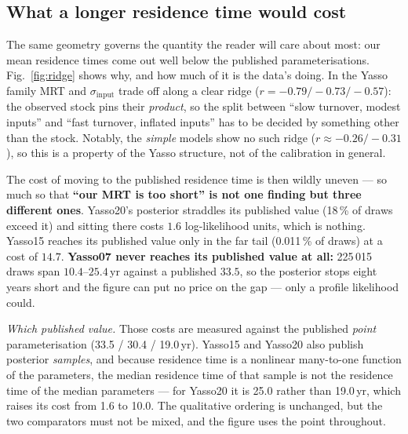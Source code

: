 \documentclass[11pt]{article}
\newcommand{\sinput}{\sigma_{\mathrm{input}}}
\newcommand{\fig}{figures}
\begin{document}
\begin{table}[htbp]\centering
\caption{\textbf{The strongest same-pool anti-correlations} (Yasso20): each is a net-flux trade-off along which the
posterior is unconstrained.}\label{tab:ridges}

\end{table}

\subsection{What a longer residence time would cost}
The same geometry governs the quantity the reader will care about most: our mean residence times come
out well below the published parameterisations. Fig.~\ref{fig:ridge} shows why, and how much of it is
the data's doing. In the Yasso family MRT and $\sinput$ trade off along a clear ridge
($r=-0.79/-0.73/-0.57$): the observed stock pins their \emph{product}, so the split between ``slow
turnover, modest inputs'' and ``fast turnover, inflated inputs'' has to be decided by something other
than the stock. Notably, the \emph{simple} models show no such ridge ($r\approx-0.26/-0.31$), so this
is a property of the Yasso structure, not of the calibration in general.

The cost of moving to the published residence time is then wildly uneven --- so much so that
\textbf{``our MRT is too short'' is not one finding but three different ones}. Yasso20's posterior
straddles its published value (18\,\% of draws exceed it) and sitting there costs $1.6$
log-likelihood units, which is nothing. Yasso15 reaches its published value only in the far tail
(0.011\,\% of draws) at a cost of $14.7$. \textbf{Yasso07 never reaches its published value at all:}
225\,015 draws span $10.4$--$25.4$\,yr against a published $33.5$, so the posterior stops eight years
short and the figure can put no price on the gap --- only a profile likelihood could.

\emph{Which published value.} Those costs are measured against the published \emph{point}
parameterisation (33.5 / 30.4 / 19.0\,yr). Yasso15 and Yasso20 also publish posterior \emph{samples},
and because residence time is a nonlinear many-to-one function of the parameters, the median residence
time of that sample is not the residence time of the median parameters --- for Yasso20 it is 25.0
rather than 19.0\,yr, which raises its cost from 1.6 to 10.0. The qualitative ordering is unchanged, but
the two comparators must not be mixed, and the figure uses the point throughout.
\end{document}

